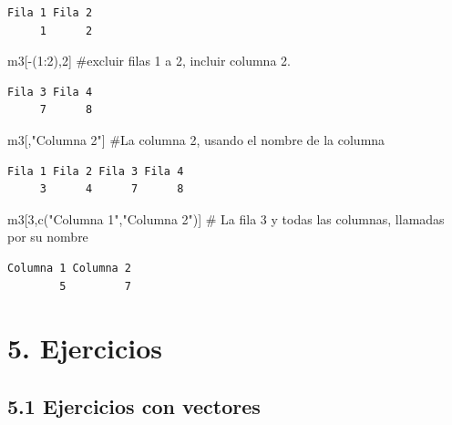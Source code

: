 \documentclass[
  letterpaper,
  DIV=11,
  numbers=noendperiod]{scrreprt}
\newenvironment{Shaded}{\begin{snugshade}}{\end{snugshade}}
\newcommand{\CommentTok}[1]{\textcolor[rgb]{0.37,0.37,0.37}{#1}}
\newcommand{\DecValTok}[1]{\textcolor[rgb]{0.68,0.00,0.00}{#1}}
\newcommand{\FunctionTok}[1]{\textcolor[rgb]{0.28,0.35,0.67}{#1}}
\newcommand{\NormalTok}[1]{\textcolor[rgb]{0.00,0.23,0.31}{#1}}
\newcommand{\SpecialCharTok}[1]{\textcolor[rgb]{0.37,0.37,0.37}{#1}}
\newcommand{\StringTok}[1]{\textcolor[rgb]{0.13,0.47,0.30}{#1}}
\begin{document}
\begin{verbatim}
Fila 1 Fila 2 
     1      2 
\end{verbatim}

\begin{Shaded}
\begin{Highlighting}[]
\NormalTok{m3[}\SpecialCharTok{{-}}\NormalTok{(}\DecValTok{1}\SpecialCharTok{:}\DecValTok{2}\NormalTok{),}\DecValTok{2}\NormalTok{] }\CommentTok{\#excluir filas 1 a 2, incluir columna 2.}
\end{Highlighting}
\end{Shaded}

\begin{verbatim}
Fila 3 Fila 4 
     7      8 
\end{verbatim}

\begin{Shaded}
\begin{Highlighting}[]
\NormalTok{m3[,}\StringTok{"Columna 2"}\NormalTok{] }\CommentTok{\#La columna 2, usando el nombre de la columna}
\end{Highlighting}
\end{Shaded}

\begin{verbatim}
Fila 1 Fila 2 Fila 3 Fila 4 
     3      4      7      8 
\end{verbatim}

\begin{Shaded}
\begin{Highlighting}[]
\NormalTok{m3[}\DecValTok{3}\NormalTok{,}\FunctionTok{c}\NormalTok{(}\StringTok{"Columna 1"}\NormalTok{,}\StringTok{"Columna 2"}\NormalTok{)] }\CommentTok{\# La fila 3 y todas las columnas, llamadas por su nombre}
\end{Highlighting}
\end{Shaded}

\begin{verbatim}
Columna 1 Columna 2 
        5         7 
\end{verbatim}

\hypertarget{ejercicios}{%
\section{5. Ejercicios}\label{ejercicios}}

\hypertarget{ejercicios-con-vectores}{%
\subsection{5.1 Ejercicios con vectores}\label{ejercicios-con-vectores}}
\end{document}
